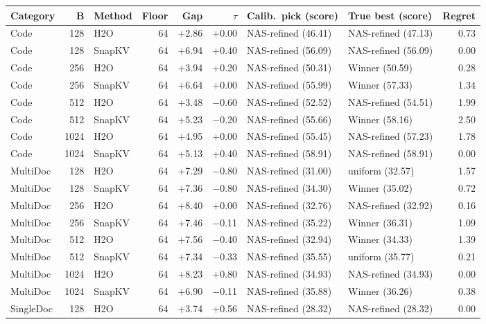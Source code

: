 \begin{table}[t]
  \centering
  \footnotesize
  \setlength{\tabcolsep}{4pt}
  \begin{tabular}{@{}l r l r r r l l r@{}}
    \toprule
    Category & B & Method & Floor & Gap & $\tau$ & Calib.\ pick (score) & True best (score) & Regret \\
    \midrule
    Code & 128 & H2O & 64 & +2.86 & +0.00 & NAS-refined (46.41) & NAS-refined (47.13) & 0.73 \\
    Code & 128 & SnapKV & 64 & +6.94 & +0.40 & NAS-refined (56.09) & NAS-refined (56.09) & 0.00 \\
    Code & 256 & H2O & 64 & +3.94 & +0.20 & NAS-refined (50.31) & Winner (50.59) & 0.28 \\
    Code & 256 & SnapKV & 64 & +6.64 & +0.00 & NAS-refined (55.99) & Winner (57.33) & 1.34 \\
    Code & 512 & H2O & 64 & +3.48 & $-$0.60 & NAS-refined (52.52) & NAS-refined (54.51) & 1.99 \\
    Code & 512 & SnapKV & 64 & +5.23 & $-$0.20 & NAS-refined (55.66) & Winner (58.16) & 2.50 \\
    Code & 1024 & H2O & 64 & +4.95 & +0.00 & NAS-refined (55.45) & NAS-refined (57.23) & 1.78 \\
    Code & 1024 & SnapKV & 64 & +5.13 & +0.40 & NAS-refined (58.91) & NAS-refined (58.91) & 0.00 \\
    MultiDoc & 128 & H2O & 64 & +7.29 & $-$0.80 & NAS-refined (31.00) & uniform (32.57) & 1.57 \\
    MultiDoc & 128 & SnapKV & 64 & +7.36 & $-$0.80 & NAS-refined (34.30) & Winner (35.02) & 0.72 \\
    MultiDoc & 256 & H2O & 64 & +8.40 & +0.00 & NAS-refined (32.76) & NAS-refined (32.92) & 0.16 \\
    MultiDoc & 256 & SnapKV & 64 & +7.46 & $-$0.11 & NAS-refined (35.22) & Winner (36.31) & 1.09 \\
    MultiDoc & 512 & H2O & 64 & +7.56 & $-$0.40 & NAS-refined (32.94) & Winner (34.33) & 1.39 \\
    MultiDoc & 512 & SnapKV & 64 & +7.34 & $-$0.33 & NAS-refined (35.55) & uniform (35.77) & 0.21 \\
    MultiDoc & 1024 & H2O & 64 & +8.23 & +0.80 & NAS-refined (34.93) & NAS-refined (34.93) & 0.00 \\
    MultiDoc & 1024 & SnapKV & 64 & +6.90 & $-$0.11 & NAS-refined (35.88) & Winner (36.26) & 0.38 \\
    SingleDoc & 128 & H2O & 64 & +3.74 & +0.56 & NAS-refined (28.32) & NAS-refined (28.32) & 0.00 \\

\end{tabular}
\end{table}
